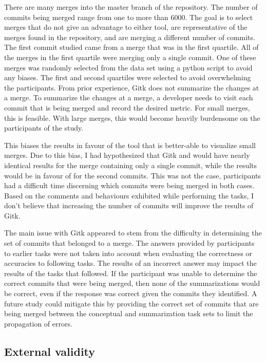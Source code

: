 There are many merges into the master branch of the repository.
The number of commits being merged range from one to more than 6000.
The goal is to select merges that do not give an advantage to either
tool, are representative of the merges found in the repository, and are
merging a different number of commits.
The first commit studied came from a merge that was in the first
quartile.
All of the merges in the first quartile were merging only a single
commit.
One of these merges was randomly selected from the data set using a
python script to avoid any biases.
The first and second quartiles were selected to avoid overwhelming the
participants.
From prior experience, Gitk does not summarize the changes at a merge.
To summarize the changes at a merge, a developer needs to visit each
commit that is being merged and record the desired metric.
For small merges, this is feasible.
With large merges, this would become heavily burdensome on the
participants of the study.

This biases the results in favour of the tool that is better-able to
visualize small merges.
Due to this bias, I had hypothesized that Gitk and \tool{} would have
nearly identical results for the merge containing only a single commit,
while the results would be in favour of \tool{} for the second commits.
This was not the case, participants had a difficult time discerning
which commits were being merged in both cases.
Based on the comments and behaviours exhibited while performing the
tasks, I don't believe that increasing the number of commits will
improve the results of Gitk.

The main issue with Gitk appeared to stem from the difficulty in
determining the set of commits that belonged to a merge.
The answers provided by participants to earlier tasks were not taken
into account when evaluating the correctness or accuracies to following
tasks. The results of an incorrect answer may impact the results of the
tasks that followed. If the participant was unable to determine the
correct commits that were being merged, then none of the summarizations
would be correct, even if the response was correct given the commits
they identified. A future study could mitigate this by providing the
correct set of commits that are being merged between the conceptual and
summarization task sets to limit the propagation of errors.

\subsection{External validity}\label{sub:external_validity}

